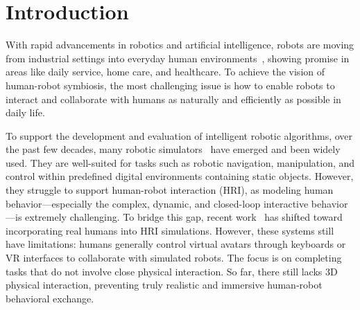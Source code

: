 \section{Introduction}
\label{sec:intro}

With rapid advancements in robotics and artificial intelligence, robots are moving from industrial settings into everyday human environments~\cite{lecun2022path,gonzalez2021service}, showing promise in areas like daily service, home care, and healthcare. To achieve the vision of human-robot symbiosis, the most challenging issue is how to enable robots to interact and collaborate with humans as naturally and efficiently as possible in daily life.%


To support the development and evaluation of intelligent robotic algorithms, over the past few decades, many robotic simulators~\cite{makoviychuk2021isaac, todorov2012mujoco,igibson, nasiriany2024robocasa} have emerged and been widely used. They are well-suited for tasks such as robotic navigation, manipulation, and control within predefined digital environments containing static objects. However, they struggle to support human-robot interaction (HRI), as modeling human behavior—especially the complex, dynamic, and closed-loop interactive behavior—is extremely challenging. To bridge this gap, recent work~\cite{HumanTHOR, liu2024collabsphere} has shifted toward incorporating real humans into HRI simulations. However, these systems still have limitations: humans generally control virtual avatars through keyboards or VR interfaces to collaborate with simulated robots. The focus is on completing tasks that do not involve close physical interaction. So far, there still lacks 3D physical interaction, preventing truly realistic and immersive human-robot behavioral exchange. %

